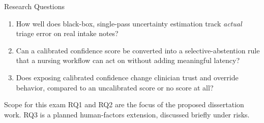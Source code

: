 \begin{frame}{Research Questions}
  \begin{enumerate}[leftmargin=1.6em, label=\textbf{RQ\arabic*.}]
    \item How well does black-box, single-pass uncertainty estimation
      track \emph{actual} triage error on real intake notes?
    \item Can a calibrated confidence score be converted into a
      selective-abstention rule that a nursing workflow can act on
      without adding meaningful latency?
    \item Does exposing calibrated confidence change clinician trust and
      override behavior, compared to an uncalibrated score or no score
      at all?
  \end{enumerate}
  \par\vspace{8pt}
  \begin{notebox}{Scope for this exam}
    RQ1 and RQ2 are the focus of the proposed dissertation work. RQ3 is a
    planned human-factors extension, discussed briefly under risks.
  \end{notebox}
\end{frame}
